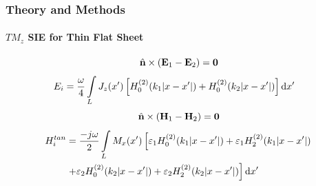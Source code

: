 \documentclass[mathserif,16pt,xcolor=table]{beamer}
\begin{document}
      \begin{frame}
      \frametitle{Theory and Methods}
      \framesubtitle{$TM_z$ SIE for Thin Flat Sheet}
      \begin{equation} \nonumber
        \hat{\mathbf{n}} \times (\mathbf{E}_1 - \mathbf{E}_2) = \mathbf{0}
        \label{eq:E1bc}
      \end{equation}
      \begin{align} \nonumber
        E_i ={}& \frac{\omega}{4} \int\limits_L J_z(x') \left[ H_0^{(2)}(k_1 | x -  x'|) + H_0^{(2)}(k_2 |x - x'|)\right] \mathop{}\!\mathrm{d}{x'}  \notag
        \label{eq:scalarE}
      \end{align}
      \begin{equation} \nonumber
        \hat{\mathbf{n}} \times (\mathbf{H}_1 - \mathbf{H}_2) = \mathbf{0}
        \label{eq:E1bc}
      \end{equation}
      \begin{align} \nonumber
        H_i^{tan} &= \frac{-j \omega}{2} \int\limits_L M_x(x') \left[ \varepsilon_1 H_0^{(2)}(k_1 |x - x'|) + \varepsilon_1 H_2^{(2)}(k_1 |x - x'|) \right. \notag\\
        & \left. + \varepsilon_2 H_0^{(2)}(k_2 |x - x'|) + \varepsilon_2 H_2^{(2)}(k_2 |x - x'|)\right] \mathop{}\!\mathrm{d}{x'} \notag
        \label{eq:scalarH}
      \end{align}
      \end{frame}
\end{document}
